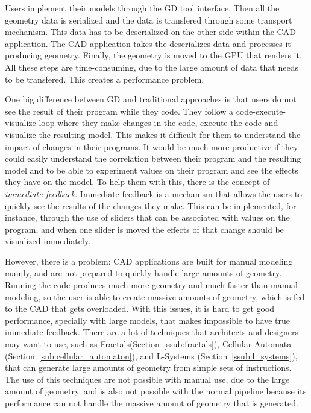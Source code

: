 
Users implement their models through the GD tool interface. Then all the geometry data is serialized and the data is transfered through some transport mechanism. This data has to be deserialized on the other side within the CAD application. The CAD application takes the deserializes data and processes it producing geometry. Finally, the geometry is moved to the GPU that renders it. All these steps are time-consuming, due to the large amount of data that needs to be transfered. This creates a performance problem.

One big difference between GD and traditional approaches is that users do not see the result of their program while they code. They follow a code-execute-visualize loop where they make changes in the code, execute the code and visualize the resulting model. This makes it difficult for them to understand the impact of changes in their programs. It would be much more productive if they could easily understand the correlation between their program and the resulting model and to be able to experiment values on their program and see the effects they have on the model. To help them with this, there is the concept of \emph{immediate feedback}. Immediate feedback is a mechanism that allows the users to quickly see the results of the changes they make. This can be implemented, for instance, through the use of sliders that can be associated with values on the program, and when one slider is moved the effects of that change should be visualized immediately. 

However, there is a problem: CAD applications are built for manual modeling mainly, and are not prepared to quickly handle large amounts of geometry. Running the code produces much more geometry and much faster than manual modeling, so the user is able to create massive amounts of geometry, which is fed to the CAD that gets overloaded. With this issues, it is hard to get good performance, specially with large models, that makes impossible to have true immediate feedback. There are a lot of techniques that architects and designers may want to use, such as Fractals(Section~\ref{ssub:fractals}), Cellular Automata (Section~\ref{sub:cellular_automaton}), and L-Systems (Section~\ref{ssub:l_systems}), that can generate large amounts of geometry from simple sets of instructions. The use of this techniques are not possible with manual use, due to the large amount of geometry, and is also not possible with the normal pipeline because its performance can not handle the massive amount of geometry that is generated.


